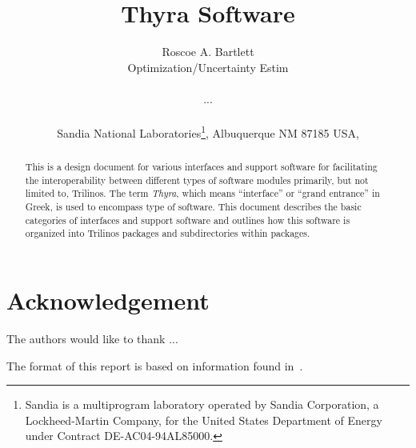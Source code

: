 \documentclass[pdf,ps2pdf,11pt]{SANDreport}
\title{
Thyra Software
}
\author{
Roscoe A. Bartlett \\ Optimization/Uncertainty Estim \\ \\
... \\ \\
Sandia National Laboratories\footnote{
Sandia is a multiprogram laboratory operated by Sandia Corporation, a
Lockheed-Martin Company, for the United States Department of Energy
under Contract DE-AC04-94AL85000.}, Albuquerque NM 87185 USA, \\
}
\date{}
\begin{document}
\maketitle

%

%
\begin{abstract}
%
This is a design document for various interfaces and support software for
facilitating the interoperability between different types of software modules
primarily, but not limited to, Trilinos.  The term {}\textit{Thyra}, which
means ``interface'' or ``grand entrance'' in Greek, is used to encompass type
of software.  This document describes the basic categories of interfaces and
support software and outlines how this software is organized into Trilinos
packages and subdirectories within packages.
%
\end{abstract}
%

%
\clearpage
\section*{Acknowledgement}
The authors would like to thank ...

The format of this report is based on information found
in~\cite{Sand98-0730}.

%
\clearpage
\tableofcontents
\listoffigures

\end{document}
